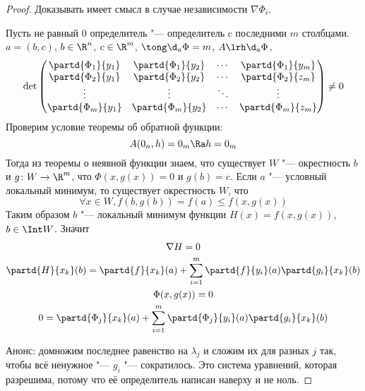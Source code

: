 \begin{proof}
	Доказывать имеет смысл в случае независимости $\nabla \Phi_i$.

	Пусть не равный 0 определитель "--- определитель c последними $m$ столбцами.
	$a = (b, c)$, $b \in \R^n$, $c \in \R^m$, $\tong \d_a \Phi = m$, $A \lrh \d_a \Phi$,
	\[
		\det \begin{pmatrix}
			\partd{\Phi_1}{y_1} & \partd{\Phi_1}{y_2} & \cdots & \partd{\Phi_1}{y_m} \\
			\partd{\Phi_2}{y_1} & \partd{\Phi_2}{y_2} & \cdots & \partd{\Phi_2}{z_m} \\
			\vdots & \vdots & \ddots & \vdots \\
			\partd{\Phi_m}{y_1} & \partd{\Phi_m}{y_2} & \cdots & \partd{\Phi_m}{z_m} \\
		\end{pmatrix} \ne 0
	\]
	Проверим условие теоремы об обратной функции:
	\[ A(0_n, h) = 0_m \Ra h = 0_m \]
	Тогда из теоремы о неявной функции знаем, что существует $W$ "--- окрестность $b$ и
	$g\colon W \to \R^m$, что $\Phi(x, g(x)) = 0$ и $g(b) = c$.
	Если $a$ "--- условный локальный минимум, то существует окрестность $W$, что
	\[ \forall x \in W, f(b, g(b)) = f(a) \le f(x, g(x)) \]
	Таким образом $b$ "--- локальный минимум функции $H(x) = f(x, g(x))$, $b \in \Int W$.
	Значит
	\begin{gather*}
		\nabla H = 0 \\
		\partd{H}{x_k}(b) = \partd{f}{x_k}(a) + \sum_{i=1}^{m} \partd{f}{y_i}(a) \partd{g_i}{x_k}(b) \\
		\Phi(x, g(x)) = 0 \\
		0 = \partd{\Phi_j}{x_k}(a) + \sum_{i=1}^{m} \partd{\Phi_j}{y_i}(a) \partd{g_i}{x_k}(b)
	\end{gather*}

	Анонс: домножим последнее равенство на $\lambda_j$ и сложим их для разных $j$ так,
	чтобы всё ненужное "--- $g_i$ "--- сократилось. Это система уравнений, которая разрешима, потому что её определитель написан наверху и не ноль.
\end{proof}
